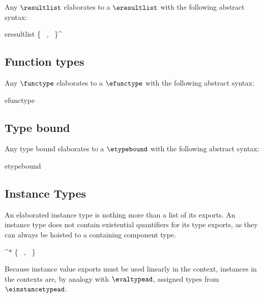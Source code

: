 Any $\resultlist$ elaborates to a $\eresultlist$ with the following
abstract syntax:

\begin{sum-production}{eresultlist}
  \evaltype \alt
  \{ \ERLNAME~\name, \ERLTYPE~\evaltype \}^\ast
\end{sum-production}

\subsection{Function types}

Any $\functype$ elaborates to a $\efunctype$ with the following
abstract syntax:

\begin{record-production}{efunctype}
  \eparamlist\to\eresultlist
\end{record-production}

\subsection{Type bound}

Any type bound elaborates to a $\etypebound$ with the following
abstract syntax:

\begin{sum-production}{etypebound}
  \ETBEQ~\edeftype \alt
  \ETBSUBR
\end{sum-production}

\subsection{Instance Types}

An elaborated instance type is nothing more than a list of its
exports. An instance type does not contain existential quantifiers for
its type exports, as they can always be hoisted to a containing
component type.

\begin{sum-productions}
   \eexterndecl^{*}
   \{ \EEDNAME~\name, \EEDDESC~\eexterndesc \}
    \EEMDCOREMODULE~\ecoremoduletype \alt
    \EEMDFUNC~\efunctype \alt
    \EEMDVALUE~\evaltype \alt
    \EEMDTYPE~\edeftype \alt
    \EEMDINSTANCE~\einstancetype \alt
    \EEMDCOMPONENT~\ecomponenttype
\end{sum-productions}

Because instance value exports must be used linearly in the context,
instances in the contexts are, by analogy with $\evaltypead$, assigned
types from $\einstancetypead$.

